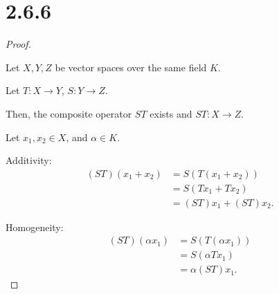 \documentclass{article}
\begin{document}
\section*{2.6.6}
\begin{proof}
  $ $
  
  Let $X, Y, Z$ be vector spaces over the same field $K$.

  Let $T: X \longrightarrow Y$, $S: Y \longrightarrow Z$.
  
  Then, the composite operator $ST$ exists and $ST: X \longrightarrow Z$.
  \newline

  Let $x_1, x_2 \in X$, and $\alpha \in K$.
  \newline

  Additivity:
  \begin{align*}
    (ST) (x_1 + x_2)
    &= S (T (x_1 + x_2)) \\
    &= S (T x_1 + T x_2) \\
    &= (ST) x_1 + (ST) x_2.
  \end{align*}

  Homogeneity:
  \begin{align*}
    (ST) (\alpha x_1)
    &= S (T (\alpha x_1)) \\
    &= S (\alpha  T x_1) \\
    &= \alpha (ST) x_1.
  \end{align*}

\end{proof}

\newpage
\end{document}
